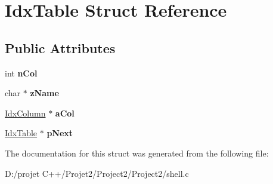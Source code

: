 \hypertarget{struct_idx_table}{}\section{Idx\+Table Struct Reference}
\label{struct_idx_table}
\subsection*{Public Attributes}
\begin{DoxyCompactItemize}
\item 
\mbox{\label{struct_idx_table_ad624e8a55c0bd13d55efd13b3b5864b8}} 
int {\bfseries n\+Col}
\item 
\mbox{\label{struct_idx_table_af28ea88beee88e04b3e6eb8107883b28}} 
char $\ast$ {\bfseries z\+Name}
\item 
\mbox{\label{struct_idx_table_a31a39f998986cc7743478af814ab35c6}} 
\mbox{\hyperlink{struct_idx_column}{Idx\+Column}} $\ast$ {\bfseries a\+Col}
\item 
\mbox{\label{struct_idx_table_aa7fb9114e8c05a3f0b42789e7bbb7f0c}} 
\mbox{\hyperlink{struct_idx_table}{Idx\+Table}} $\ast$ {\bfseries p\+Next}
\end{DoxyCompactItemize}


The documentation for this struct was generated from the following file\+:\begin{DoxyCompactItemize}
\item 
D\+:/projet C++/\+Projet2/\+Project2/\+Project2/shell.\+c\end{DoxyCompactItemize}
